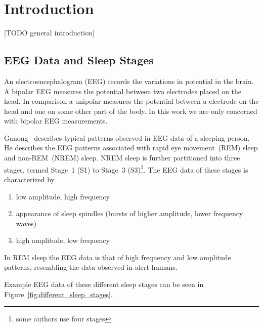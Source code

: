 \chapter{Introduction}
\label{chapter:introduction}

[TODO general introduction]


\section{EEG Data and Sleep Stages}
\label{sec:eeg_data_and_sleep_stages}

An electroencephalogram (EEG) records the variations in potential in the brain. A bipolar EEG measures the potential between two electrodes placed on the head. In comparison a unipolar measures the potential between a electrode on the head and one on some other part of the body. In this work we are only concerned with bipolar EEG measurements.

Ganong~\cite[chapter~11]{Ganong1997} describes typical patterns observed in EEG data of a sleeping person. He describes the EEG patterns associated with rapid eye movement~(REM) sleep and non-REM~(NREM) sleep. NREM sleep is further partitioned into three stages, termed Stage~1 (S1) to Stage~3 (S3)\footnote{some authors use four stages}. The EEG data of these stages is characterized by

\begin{enumerate}[label={S\arabic*:}]
	\item low amplitude, high frequency
	\item appearance of sleep spindles (bursts of higher amplitude, lower frequency waves)
	\item high amplitude, low frequency
\end{enumerate}

\noindent
In REM sleep the EEG data is that of high frequency and low amplitude patterns, resembling the data observed in alert humans.

Example EEG data of these different sleep stages can be seen in Figure~\ref{fig:different_sleep_stages}.

